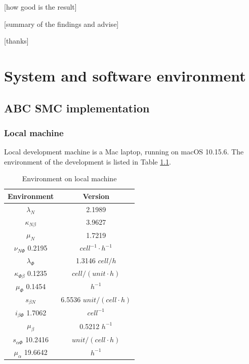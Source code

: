 \documentclass[12pt,a4paper]{report}
\begin{document}
 [how good is the result]

 [summary of the findings and advise]

 [thanks]








\appendix

\chapter{System and software environment}

\section{ABC SMC implementation}

\subsection{Local machine}

Local development machine is a Mac laptop, running on macOS 10.15.6. The environment of the development is listed in Table \ref{table:local_macine}.

\begin{table}[h!]
    \centering
    \begin{tabular}{|c c|}
        \hline
        Environment                 & Version                       \\ [0.5ex]
        \hline\hline
        $\lambda_N$                 & 2.1989                        \\
        $\kappa_{N\beta}$           & 3.9627                        \\
        $\mu_N$                     & 1.7219                        \\
        $\nu_{N\Phi}$  0.2195       & $cell^{-1}\cdotp h^{-1}$      \\
        \hline
        $\lambda_\Phi$              & 1.3146  $cell/h$              \\
        $\kappa_{\Phi\beta}$ 0.1235 & $cell/(unit\cdotp h)$         \\
        $\mu_\Phi$  0.1454          & $h^{-1}$                      \\
        \hline
        $s_{\beta N}$               & 6.5536  $unit/(cell\cdotp h)$ \\
        $i_{\beta\Phi}$  1.7062     & $cell^{-1}$                   \\
        $\mu_\beta$                 & 0.5212  $h^{-1}$              \\
        \hline
        $s_{\alpha\Phi}$  10.2416   & $unit/(cell\cdotp h)$         \\
        $\mu_\alpha$ 19.6642        & $h^{-1}$                      \\
        [1ex]
        \hline
    \end{tabular}
    \caption{Environment on local machine}
    \label{table:local_macine}
\end{table}
\end{document}
